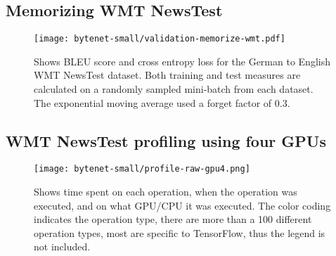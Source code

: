 \subsection{Memorizing WMT NewsTest}
\begin{figure}[h]
    \centering
    \texttt{[image: bytenet-small/validation-memorize-wmt.pdf]}
    \caption{Shows BLEU score and cross entropy loss for the German to English WMT NewsTest dataset. Both training and test measures are calculated on a randomly sampled mini-batch from each dataset. The exponential moving average used a forget factor of $0.3$.}
\end{figure}
\clearpage

\subsection{WMT NewsTest profiling using four GPUs}
\begin{figure}[h]
    \centering
    \texttt{[image: bytenet-small/profile-raw-gpu4.png]}
    \caption{Shows time spent on each operation, when the operation was executed, and on what GPU/CPU it was executed. The color coding indicates the operation type, there are more than a 100 different operation types, most are specific to TensorFlow, thus the legend is not included.}
\end{figure}
\clearpage




